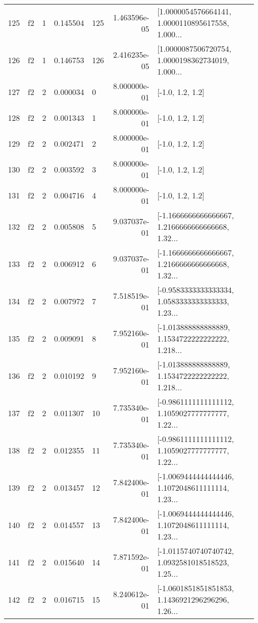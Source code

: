 \begin{tabular}{lllrlrl}
125 &  f2 &   1 &  0.145504 &  125 &  1.463596e-05 &  [1.0000054576664141, 1.0000110895617558, 1.000... \\
126 &  f2 &   1 &  0.146753 &  126 &  2.416235e-05 &  [1.0000087506720754, 1.0000198362734019, 1.000... \\
127 &  f2 &   2 &  0.000034 &    0 &  8.000000e-01 &                                   [-1.0, 1.2, 1.2] \\
128 &  f2 &   2 &  0.001343 &    1 &  8.000000e-01 &                                   [-1.0, 1.2, 1.2] \\
129 &  f2 &   2 &  0.002471 &    2 &  8.000000e-01 &                                   [-1.0, 1.2, 1.2] \\
130 &  f2 &   2 &  0.003592 &    3 &  8.000000e-01 &                                   [-1.0, 1.2, 1.2] \\
131 &  f2 &   2 &  0.004716 &    4 &  8.000000e-01 &                                   [-1.0, 1.2, 1.2] \\
132 &  f2 &   2 &  0.005808 &    5 &  9.037037e-01 &  [-1.1666666666666667, 1.2166666666666668, 1.32... \\
133 &  f2 &   2 &  0.006912 &    6 &  9.037037e-01 &  [-1.1666666666666667, 1.2166666666666668, 1.32... \\
134 &  f2 &   2 &  0.007972 &    7 &  7.518519e-01 &  [-0.9583333333333334, 1.0583333333333333, 1.23... \\
135 &  f2 &   2 &  0.009091 &    8 &  7.952160e-01 &  [-1.013888888888889, 1.1534722222222222, 1.218... \\
136 &  f2 &   2 &  0.010192 &    9 &  7.952160e-01 &  [-1.013888888888889, 1.1534722222222222, 1.218... \\
137 &  f2 &   2 &  0.011307 &   10 &  7.735340e-01 &  [-0.9861111111111112, 1.1059027777777777, 1.22... \\
138 &  f2 &   2 &  0.012355 &   11 &  7.735340e-01 &  [-0.9861111111111112, 1.1059027777777777, 1.22... \\
139 &  f2 &   2 &  0.013457 &   12 &  7.842400e-01 &  [-1.0069444444444446, 1.1072048611111114, 1.23... \\
140 &  f2 &   2 &  0.014557 &   13 &  7.842400e-01 &  [-1.0069444444444446, 1.1072048611111114, 1.23... \\
141 &  f2 &   2 &  0.015640 &   14 &  7.871592e-01 &  [-1.0115740740740742, 1.0932581018518523, 1.25... \\
142 &  f2 &   2 &  0.016715 &   15 &  8.240612e-01 &  [-1.0601851851851853, 1.1436921296296296, 1.26... \\

\end{tabular}
